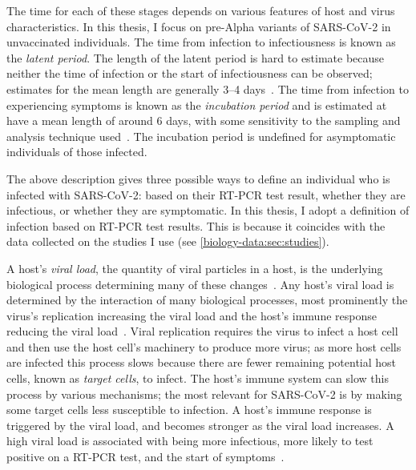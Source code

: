 \documentclass[thesis.tex]{subfiles}
\begin{document}
The time for each of these stages depends on various features of host and virus characteristics.
In this thesis, I focus on pre-Alpha variants of SARS-CoV-2 in unvaccinated individuals.
The time from infection to infectiousness is known as the \emph{latent period}.
The length of the latent period is hard to estimate because neither the time of infection or the start of infectiousness can be observed; estimates for the mean length are generally 3--4 days~\autocite{zhaoEstimating}.
The time from infection to experiencing symptoms is known as the \emph{incubation period} and is estimated at have a mean length of around 6 days, with some sensitivity to the sampling and analysis technique used~\autocite{wuIncubation,quesadaIncubation,aleneSerial}.
The incubation period is undefined for asymptomatic individuals of those infected.

The above description gives three possible ways to define an individual who is infected with SARS-CoV-2: based on their RT-PCR test result, whether they are infectious, or whether they are symptomatic.
In this thesis, I adopt a definition of infection based on RT-PCR test results.
This is because it coincides with the data collected on the studies I use (see \cref{biology-data:sec:studies}).

A host's \emph{viral load}, the quantity of viral particles in a host, is the underlying biological process determining many of these changes~\autocite{puhachSARSCoV2}.
Any host's viral load is determined by the interaction of many biological processes, most prominently the virus's replication increasing the viral load and the host's immune response reducing the viral load~\autocite{keVivo}.
Viral replication requires the virus to infect a host cell and then use the host cell's machinery to produce more virus; as more host cells are infected this process slows because there are fewer remaining potential host cells, known as \emph{target cells}, to infect.
The host's immune system can slow this process by various mechanisms; the most relevant for SARS-CoV-2 is by making some target cells less susceptible to infection.
A host's immune response is triggered by the viral load, and becomes stronger as the viral load increases.
A high viral load is associated with being more infectious, more likely to test positive on a RT-PCR test, and the start of symptoms~\autocite{puhachSARSCoV2,keVivo}.


\end{document}
